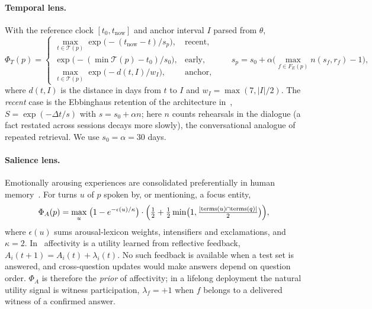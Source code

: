 \paragraph{Temporal lens.}
With the reference clock $[t_0,t_{\text{now}}]$ and anchor interval $I$ parsed
from $\theta$,
\begin{equation}
  \Phi_T(p)=
  \begin{cases}
   \max_{t\in\mathcal{T}(p)}\exp\!\bigl(-(t_{\text{now}}-t)/s_p\bigr),
     & \text{recent},\\
   \exp\!\bigl(-(\min\mathcal{T}(p)-t_0)/s_0\bigr), & \text{early},\\
   \max_{t\in\mathcal{T}(p)}\exp\!\bigl(-d(t,I)/w_I\bigr), & \text{anchor},
  \end{cases}
  \qquad s_p=s_0+\alpha\bigl(\max_{f\in F_E(p)}n(s_f,r_f)-1\bigr),
  \label{eq:temporal}
\end{equation}
where $d(t,I)$ is the distance in days from $t$ to $I$ and
$w_I=\max(7,|I|/2)$. The \emph{recent} case is the Ebbinghaus retention of the
architecture in~\cite{flexa2026bridging}, $S=\exp(-\Delta t/s)$ with
$s=s_0+\alpha n$; here $n$ counts rehearsals in the dialogue (a fact restated
across sessions decays more slowly), the conversational analogue of repeated
retrieval. We use $s_0=\alpha=30$ days.

\paragraph{Salience lens.}
Emotionally arousing experiences are consolidated preferentially in human
memory~\cite{mcgaugh2004amygdala}. For turns $u$ of $p$ spoken by, or
mentioning, a focus entity,
\begin{equation}
  \Phi_A(p)=\max_{u}\;\bigl(1-e^{-\epsilon(u)/\kappa}\bigr)\cdot
  \Bigl(\tfrac12+\tfrac12\min\bigl(1,\tfrac{|\mathrm{terms}(u)\cap\mathrm{terms}(q)|}{2}\bigr)\Bigr),
  \label{eq:salience}
\end{equation}
where $\epsilon(u)$ sums arousal-lexicon weights, intensifiers and
exclamations, and $\kappa=2$. In~\cite{flexa2026bridging} affectivity is a
utility learned from reflective feedback, $A_i(t+1)=A_i(t)+\lambda_i(t)$. No
such feedback is available when a test set is answered, and cross-question
updates would make answers depend on question order. $\Phi_A$ is therefore
the \emph{prior} of affectivity; in a lifelong deployment the natural
utility signal is witness participation, $\lambda_f=+1$ when $f$ belongs to a
delivered witness of a confirmed answer.

